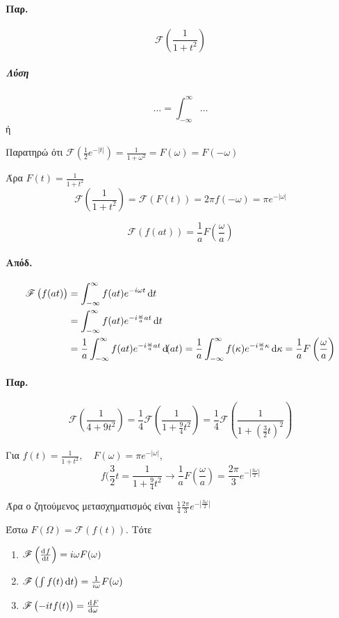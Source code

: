 \documentclass[11pt,a4paper,titlepage,final]{article}
\begin{document}
\paragraph{Παρ.}
\[
 \mathscr{F} \left(
 \frac{1}{1+t^2}
 \right)
\]
\subparagraph{Λύση}
\[
\dots = \int_{-\infty}^\infty \dots
\]
ή

Παρατηρώ ότι \( \mathscr{F} (\frac{1}{2}e^{-|t|}) = \frac{1}{1+\omega^2} = F(\omega) = F(-\omega)\)

Άρα \(F(t) = \frac{1}{1+t^2}\)
\[
 \mathscr{F}  \left(
 \frac{1}{1+t^2}
 \right) =  \mathscr{F} \left( F(t) \right) = 2\pi f(-\omega) = \pi e^{-|\omega|}
\]

\begin{theorem}{}{}
\[
 \mathscr{F} \left( f(at) \right) = \frac{1}{a} F \left(\frac{\omega}{a} \right)
\]
\end{theorem}
\paragraph{Απόδ.}
\begin{align*}
 \mathscr{F} \left( f(at) \right)&=\int_{-\infty}^\infty f(at) e^{-i  \omega t} \dif t
 \\ &=
 \int_{-\infty}^\infty f(at)e^{-i\frac{\omega}{a}at} \dif t
 \\ &=
\frac{1}{a}  \int_{-\infty}^\infty f(at)e^{-i\frac{\omega}{a}at} \dif (at)
=
\frac{1}{a} \int_{-\infty}^\infty f(\kappa) e^{-i\frac{\omega}{a}\kappa} \dif \kappa
= \frac{1}{a}	F\left( \frac{\omega}{a}\right)
\end{align*}

\paragraph{Παρ.}
\[
 \mathscr{F} \left( \frac{1}{4+9t^2} \right)
 = \frac{1}{4} \mathscr{F} \left( \frac{1}{1+\frac{9}{4}t^2} \right) 
 = \frac{1}{4}  \mathscr{F} \left( \frac{1}{1+\left(\frac{3}{2}t\right)^2} \right)
\]

Για \(f(t) = \frac{1}{1+t^2}, \quad F(\omega) = \pi e^{-|\omega|}\),
\[
f(\frac{3}{2}t = \frac{1}{1+\frac{9}{4}t^2} \rightarrow
\frac{1}{a} F\left(\frac{\omega}{a}\right) = \frac{2\pi}{3} e^{-\left|\frac{3\omega}{2}\right|}
\]

Άρα ο ζητούμενος μετασχηματισμός είναι \(
\frac{1}{4} \frac{2\pi}{3} e^{-\left|\frac{3\omega}{2}\right|}
\)


\begin{theorem*}{}
Έστω \(F(\Omega) = \mathscr{F}(f(t))\). Τότε
\begin{enumerate}
\item \(\mathscr{F}\left(\od{f}{t}\right) = i\omega F(\omega)\)
\item \(\mathscr{F}\left(\int f(t)\dif t\right) = \frac{1}{i\omega}F( \omega )\)
\item \(\mathscr{F}\left(-itf(t)\right) = \od{F}{\omega}\)
\end{enumerate}
\end{theorem*}
\end{document}
